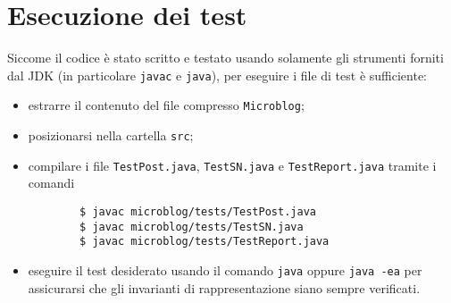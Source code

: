 \section{Esecuzione dei test}

Siccome il codice è stato scritto e testato usando solamente gli strumenti forniti dal JDK (in particolare \texttt{javac} e \texttt{java}), per eseguire i file di test è sufficiente:
\begin{itemize}
    \item estrarre il contenuto del file compresso \texttt{Microblog};
    \item posizionarsi nella cartella \texttt{src};
    \item compilare i file \texttt{TestPost.java}, \texttt{TestSN.java} e \texttt{TestReport.java} tramite i comandi 
    \begin{verbatim}
        $ javac microblog/tests/TestPost.java
        $ javac microblog/tests/TestSN.java
        $ javac microblog/tests/TestReport.java
    \end{verbatim} 
    \item eseguire il test desiderato usando il comando \texttt{java} oppure \texttt{java -ea} per assicurarsi che gli invarianti di rappresentazione siano sempre verificati.
\end{itemize}


